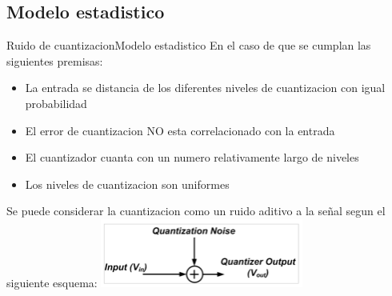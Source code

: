 \begin{darkframes}
      \subsection{Modelo estadistico}
      \begin{frame}{Ruido de cuantizacion}{Modelo estadistico}
         En el caso de que se cumplan las siguientes premisas:
         \begin{itemize}
                \item La entrada se distancia de los diferentes niveles de cuantizacion con igual probabilidad
                \item El error de cuantizacion NO esta correlacionado con la entrada
                \item El cuantizador cuanta con un numero relativamente largo de niveles
                \item Los niveles de cuantizacion son uniformes
         \end{itemize}
            Se puede considerar la cuantizacion como un ruido aditivo a la señal segun el siguiente esquema:
      \center\includegraphics[width=0.5\textwidth]{1_clase/noise_model}
      \vfill
   \end{frame}




















































\end{darkframes}
